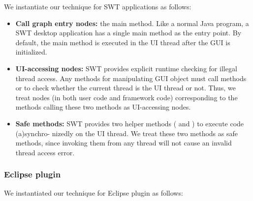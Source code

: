 We instantiate our technique for SWT applications as follows:


\begin{itemize}

\item \textbf{Call graph entry nodes: } the main method. Like a normal Java program,
a SWT desktop application has a single main method as the entry point. By default,
the main method is executed in the UI thread after the GUI
is initialized.

\item \textbf{UI-accessing nodes: } SWT provides explicit
runtime checking for illegal thread access. Any methods for manipulating
GUI object must call methods 
or  to check whether the current
thread is the UI thread or not.
Thus, we treat nodes (in both user code and framework code) corresponding to the methods
calling these two methods as UI-accessing nodes.

\item \textbf{Safe methods: } SWT provides two helper methods (
and ) to execute code (a)synchro-
nizedly on the UI thread.
 We treat these two methods as safe methods, since invoking
them from any thread 
will not cause an invalid thread access error.

\end{itemize}

\subsubsection{Eclipse plugin}

We instantiated our technique for Eclipse plugin as follows:


